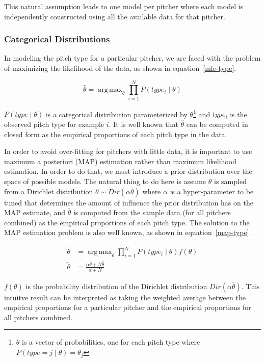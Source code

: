 \documentclass{article}
\DeclareMathOperator*{\argmax}{arg\,max}
\begin{document}
This natural assumption leads to one model per pitcher where each model is independently constructed using all the available data for that pitcher.  

\subsubsection{Categorical Distributions}

In modeling the pitch type for a particular pitcher, we are faced with the problem of maximizing the likelihood of the data, as shown in equation~\ref{mle-type}.

\begin{equation} \label{mle-type}
\hat{\theta} = \argmax_{\theta} \prod_{i=1}^N P(type_i \mid \theta)
\end{equation}

$P(type \mid \theta) $ is a categorical distribution parameterized by $ \theta $\footnote{$\theta$ is a vector of probabilities, one for each pitch type where $ P(type = j \mid \theta) = \theta_j $} and $ type_i $ is the observed pitch type for example $i$.  It is well known that $ \hat{\theta} $ can be computed in closed form as the empirical proportions of each pitch type in the data. 

In order to avoid over-fitting for pitchers with little data, it is important to use maximum a posteriori (MAP) estimation rather than maximum likelihood estimation.  In order to do that, we must introduce a prior distribution over the space of possible models.  The natural thing to do here is assume $ \theta $ is sampled from a Dirichlet distribution $ \theta \sim Dir(\alpha \bar{\theta}) $ where $ \alpha $ is a hyper-parameter to be tuned that determines the amount of influence the prior distribution has on the MAP estimate, and $ \bar{\theta} $ is computed from the sample data (for all pitchers combined) as the empirical proportions of each pitch type.  The solution to the MAP estimation problem is also well known, as shown in equation~\ref{map-type}.

\begin{equation} \label{map-type}
\begin{split}
\tilde{\theta} &= \argmax_{\theta} \prod_{i=1}^N P(type_i \mid \theta) f(\theta) \\
\tilde{\theta} &= \frac{\alpha \bar{\theta} + N \hat{\theta}}{\alpha + N}
\end{split}
\end{equation}

$ f(\theta) $ is the probability distribution of the Dirichlet distribution $ Dir(\alpha \bar{\theta}) $.  This intuitve result can be interpreted as taking the weighted average between the empirical proportions for a particular pitcher and the empirical proportions for all pitchers combined.
\end{document}
